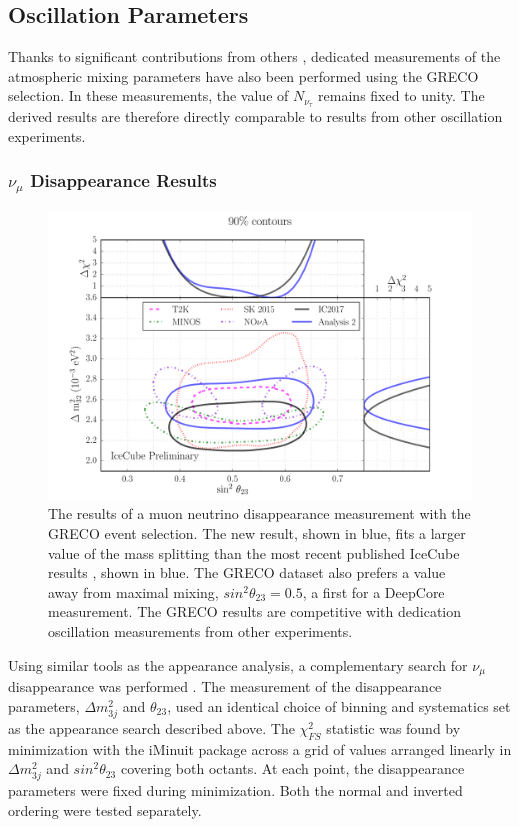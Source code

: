 \label{subsec:oscil_results}
\subsection{Oscillation Parameters}
Thanks to significant contributions from others \cite{Thesis-Martin,Thesis-Elim}, dedicated measurements of the atmospheric mixing parameters have also been performed using the GRECO selection.
In these measurements, the value of ${N_{\nu_\tau}}$ remains fixed to unity.
The derived results are therefore directly comparable to results from other oscillation experiments.

\label{subsubsec:disappearance_results}
\subsubsection{$\nu_\mu$ Disappearance Results}
\begin{figure}
\centering
\includegraphics[width=\textwidth]{michael_contours_external.pdf} 
\caption[The results of a disappearance fit with GRECO]{The results of a muon neutrino disappearance measurement with the GRECO event selection. The new result, shown in blue, fits a larger value of the mass splitting than the most recent published IceCube results \cite{IceCube-Oscillation2018}, shown in blue. The GRECO dataset also prefers a value away from maximal mixing, $sin^2\theta_{23}=0.5$, a first for a DeepCore measurement. The GRECO results are competitive with dedication oscillation measurements from other experiments.}
\label{fig:greco_disappearance}
\end{figure}

Using similar tools as the appearance analysis, a complementary search for ${\nu_\mu}$ disappearance was performed \cite{Thesis-Elim}.
The measurement of the disappearance parameters, ${\Delta m^2_{3j}}$ and ${\theta_{23}}$, used an identical choice of binning and systematics set as the appearance search described above.
The $\chi^2_{FS}$ statistic was found by minimization with the iMinuit package \cite{iminuit-code,iminuit-paper} across a grid of values arranged linearly in ${\Delta m^2_{3j}}$ and ${sin^2\theta_{23}}$ covering both octants.
At each point, the disappearance parameters were fixed during minimization.
Both the normal and inverted ordering were tested separately.

